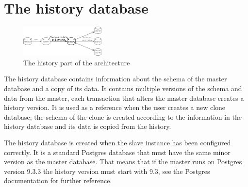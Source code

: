 \section{The history database}

\begin{figure}
  \vspace{-20pt}
  \begin{center}
    \includegraphics[width=0.38\textwidth]{img/architecture-history}
  \end{center}
  \vspace{-20pt}
  \caption{The history part of the architecture}
  \vspace{-10pt}
\end{figure}

The history database contains information about the schema of the master database and a copy of its data.
It contains multiple versions of the schema and data from the master, each transaction that alters the master database creates a history version.
It is used as a reference when the user creates a new clone database; the schema of the clone is created according to the information in the history database and its data is copied from the history.

The history database is created when the slave instance has been configured correctly.
It is a standard Postgres database that must have the same minor version as the master database.
That means that if the master runs on Postgres version 9.3.3 the history version must start with 9.3, see the Postgres documentation for further reference. %


